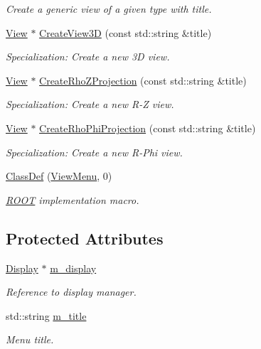 \begin{DoxyCompactItemize}
\begin{DoxyCompactList}\small\item\em Create a generic view of a given type with title. \end{DoxyCompactList}\item 
\hyperlink{class_d_d4hep_1_1_view}{View} $\ast$ \hyperlink{class_d_d4hep_1_1_view_menu_a6fe4cbbcdf7aa56913ae390730d8d12f}{Create\+View3D} (const std\+::string \&title)
\begin{DoxyCompactList}\small\item\em Specialization\+: Create a new 3D view. \end{DoxyCompactList}\item 
\hyperlink{class_d_d4hep_1_1_view}{View} $\ast$ \hyperlink{class_d_d4hep_1_1_view_menu_a1ef807a24d6a871036cd738e45a8cedf}{Create\+Rho\+Z\+Projection} (const std\+::string \&title)
\begin{DoxyCompactList}\small\item\em Specialization\+: Create a new R-\/Z view. \end{DoxyCompactList}\item 
\hyperlink{class_d_d4hep_1_1_view}{View} $\ast$ \hyperlink{class_d_d4hep_1_1_view_menu_a66ee705a3132333b27a1eed2ea6caeea}{Create\+Rho\+Phi\+Projection} (const std\+::string \&title)
\begin{DoxyCompactList}\small\item\em Specialization\+: Create a new R-\/\+Phi view. \end{DoxyCompactList}\item 
\hyperlink{class_d_d4hep_1_1_view_menu_ae114589d23508b5e814581c6b198858b}{Class\+Def} (\hyperlink{class_d_d4hep_1_1_view_menu}{View\+Menu}, 0)
\begin{DoxyCompactList}\small\item\em \hyperlink{namespace_r_o_o_t}{R\+O\+OT} implementation macro. \end{DoxyCompactList}\end{DoxyCompactItemize}
\subsection*{Protected Attributes}
\begin{DoxyCompactItemize}
\item 
\hyperlink{class_d_d4hep_1_1_display}{Display} $\ast$ \hyperlink{class_d_d4hep_1_1_view_menu_ac7a1b305e90ceedc0b6294389843473e}{m\+\_\+display}
\begin{DoxyCompactList}\small\item\em Reference to display manager. \end{DoxyCompactList}\item 
std\+::string \hyperlink{class_d_d4hep_1_1_view_menu_a1562e57c30d77349a81e1d6e93918293}{m\+\_\+title}
\begin{DoxyCompactList}\small\item\em Menu title. \end{DoxyCompactList}\end{DoxyCompactItemize}

